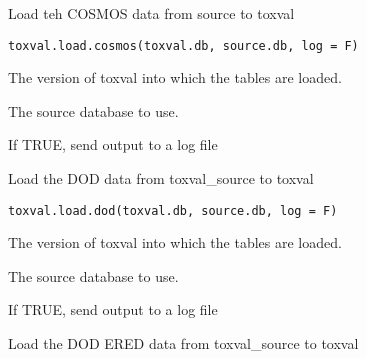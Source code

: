 \documentclass[letterpaper]{book}
\begin{document}
%
\begin{Description}\relax
Load teh COSMOS data from source to toxval
\end{Description}
%
\begin{Usage}
\begin{verbatim}
toxval.load.cosmos(toxval.db, source.db, log = F)
\end{verbatim}
\end{Usage}
%
\begin{Arguments}
\begin{ldescription}
\item[\code{toxval.db}] The version of toxval into which the tables are loaded.

\item[\code{source.db}] The source database to use.

\item[\code{log}] If TRUE, send output to a log file
\end{ldescription}
\end{Arguments}
%
\begin{Description}\relax
Load the DOD data from toxval\_source to toxval
\end{Description}
%
\begin{Usage}
\begin{verbatim}
toxval.load.dod(toxval.db, source.db, log = F)
\end{verbatim}
\end{Usage}
%
\begin{Arguments}
\begin{ldescription}
\item[\code{toxval.db}] The version of toxval into which the tables are loaded.

\item[\code{source.db}] The source database to use.

\item[\code{log}] If TRUE, send output to a log file
\end{ldescription}
\end{Arguments}
%
\begin{Description}\relax
Load the DOD ERED data from toxval\_source to toxval
\end{Description}
\end{document}
